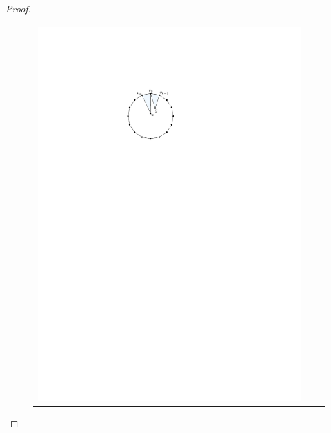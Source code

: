 \documentclass[12pt]{article}
\theoremstyle{definition}
\begin{document}
\begin{proof}
\begin{figure}
\begin{center}
\begin{tabular}{ccc}
        \includegraphics[page=2]{figs/really_good} &

\end{tabular}
\end{center}
\end{figure}
\end{proof}
\end{document}
